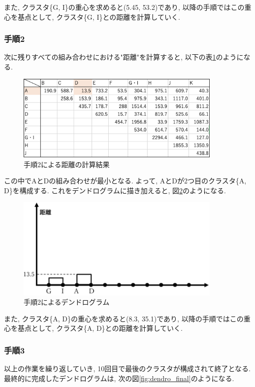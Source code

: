 \documentclass[a4paper,11pt,dvipdfmx]{jsarticle}
\makeatletter
\newcommand{\tblcaption}[1]{\def\@captype{table}\caption{#1}}
\makeatother
\begin{document}
また, クラスタ\{G, I\}の重心を求めると(5.45, 53.2)であり, 以降の手順ではこの重心を基点として, クラスタ\{G, I\}との距離を計算していく. 


\subsubsection*{手順2}
次に残りすべての組み合わせにおける"距離"を計算すると, 以下の表\ref{tab:seconde_distance}のようになる. 

\begin{figure}[htb]
  \centering
  \tblcaption{手順2による距離の計算結果}
  \label{tab:seconde_distance}
  \includegraphics[width=10cm]{../pics/tab2.png}
\end{figure}

この中でAとDの組み合わせが最小となる. よって, AとDが2つ目のクラスタ\{A, D\}を構成する. これをデンドログラムに描き加えると, 図\ref{fig:dendro2}のようになる. 

\begin{figure}[htb]
  \centering
  \includegraphics[width=10cm]{../pics/dendro_2.png}
  \caption{手順2によるデンドログラム}
  \label{fig:dendro2}
\end{figure}

また, クラスタ\{A, D\}の重心を求めると(8.3, 35.1)であり, 以降の手順ではこの重心を基点として, クラスタ\{A, D\}との距離を計算していく. 

\clearpage

\subsubsection*{手順3}
以上の作業を繰り返していき, 10回目で最後のクラスタが構成されて終了となる. 
最終的に完成したデンドログラムは, 次の図\ref{fig:dendro_final}のようになる. 
\end{document}
